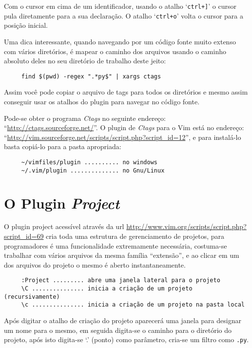 Com o cursor em cima de um identificador, usando o atalho `\verb|ctrl+]|' o cursor pula diretamente 
para a sua declaração. O atalho `\verb|ctrl+o|' volta o cursor para a posição inicial.

Uma dica interessante, quando navegando por um código fonte muito extenso com vários diretórios, 
é mapear o caminho dos arquivos usando o caminho absoluto deles no seu diretório de trabalho 
deste jeito:

\begin{verbatim}
     find $(pwd) -regex ".*py$" | xargs ctags
\end{verbatim}

Assim você pode copiar o arquivo de tags para todos os diretórios e mesmo assim conseguir usar 
os atalhos do plugin para navegar no código fonte.

Pode-se obter o programa {\em Ctags} no seguinte endereço: 
``\url{http://ctags.sourceforge.net/}''. O plugin de {\em Ctags} para o Vim está no endereço: 
``\url{http://vim.sourceforge.net/scripts/script.php?script\_id=12}'', 
e para instalá-lo basta copiá-lo para a pasta apropriada:
    
\begin{verbatim}
     ~/vimfiles/plugin .......... no windows
     ~/.vim/plugin .............. no Gnu/Linux
\end{verbatim}


\section{O Plugin {\em Project}}

O plugin project acessível através da url \url{http://www.vim.org/scripts/script.php?script\_id=69}
cria toda uma estrutura de gerenciamento de projetos, para programadores é uma funcionalidade
extremamente necessária, costuma-se trabalhar com vários arquivos da mesma família ``extensão'', 
e ao clicar em um dos arquivos do projeto o mesmo é aberto instantaneamente.

\begin{verbatim}
     :Project ......... abre uma janela lateral para o projeto
     \C ............... inicia a criação de um projeto (recursivamente)
     \c ............... inicia a criação de um projeto na pasta local
\end{verbatim}

Após digitar o atalho de criação do projeto aparecerá uma janela para designar um nome
para o mesmo, em seguida digita-se o caminho para o diretório do projeto, após isto
digita-se `.' (ponto) como parâmetro, cria-se um filtro como {\tt *.py}.


